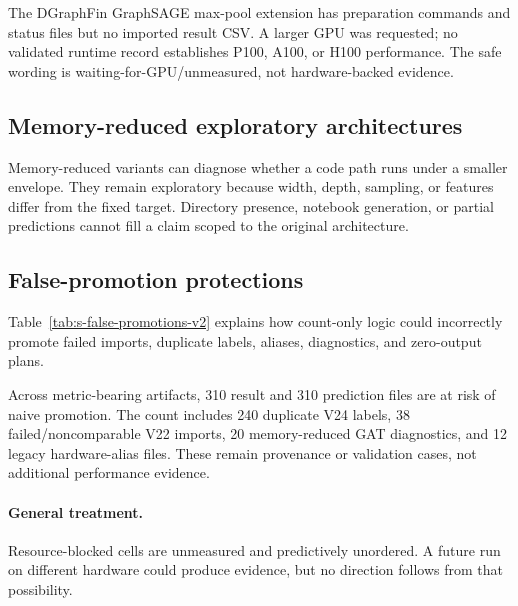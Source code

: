 The DGraphFin GraphSAGE max-pool extension has preparation commands and status files but no imported result CSV. A larger GPU was requested; no validated runtime record establishes P100, A100, or H100 performance. The safe wording is waiting-for-GPU/unmeasured, not hardware-backed evidence.

\subsection{Memory-reduced exploratory architectures}

Memory-reduced variants can diagnose whether a code path runs under a smaller envelope. They remain exploratory because width, depth, sampling, or features differ from the fixed target. Directory presence, notebook generation, or partial predictions cannot fill a claim scoped to the original architecture.

\subsection{False-promotion protections}

Table~\ref{tab:s-false-promotions-v2} explains how count-only logic could incorrectly promote failed imports, duplicate labels, aliases, diagnostics, and zero-output plans.



Across metric-bearing artifacts, 310 result and 310 prediction files are at risk of naive promotion. The count includes 240 duplicate V24 labels, 38 failed/noncomparable V22 imports, 20 memory-reduced GAT diagnostics, and 12 legacy hardware-alias files. These remain provenance or validation cases, not additional performance evidence.

\paragraph{General treatment.}
Resource-blocked cells are unmeasured and predictively unordered. A future run on different hardware could produce evidence, but no direction follows from that possibility.
